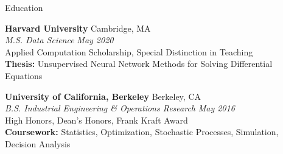 \documentclass{resume} %
\begin{document}

\begin{rSection}{Education}

{\bf Harvard University} \hfill { Cambridge, MA}
	\\ {\em M.S. Data Science} \hfill {\em May 2020}
	\\ Applied Computation Scholarship, Special Distinction in Teaching
	\\ {\bf Thesis:} Unsupervised Neural Network Methods for Solving Differential Equations

{\bf University of California, Berkeley} \hfill {Berkeley, CA}
	\\ {\em B.S. Industrial Engineering \& Operations Research} \hfill {\em May 2016}
	\\ High Honors, Dean's Honors, Frank Kraft Award
	\\ {\bf Coursework:} Statistics, Optimization, Stochastic Processes, Simulation, Decision Analysis

\end{rSection}

\end{document}
